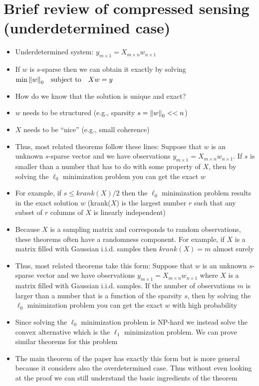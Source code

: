 \section{Brief review of compressed sensing (underdetermined case)}
\begin{itemize}
	\item Underdetermined system: $y_{m\times 1} = X_{m\times n}w_{n\times 1}$
	\item If $w$ is $s$-sparse then we can obtain it exactly by solving \\
	$ \min \norm{w}_0 \quad \text{subject to} \quad Xw = y $
	\item How do we know that the solution is unique and exact?
	\item $w$ needs to be structured (e.g., sparsity $s = \norm{w}_0 << n$)
	\item $X$ needs to be ``nice'' (e.g., small coherence)
	\item Thus, most related theorems follow these lines: Suppose that $w$ is an unknown $s$-sparse vector and we have observations $y_{m\times 1} = X_{m\times n}w_{n\times 1}$.
	If $s$ is smaller than a number that has to do with some property of $X$, then by solving the $\ell_0$ minimization problem you can get the exact $w$
	\item For example, if $s \leq krank(X)/2$ then the $\ell_0$ minimization problem results in the exact solution $w$ (krank($X$) is the largest number $r$ such that any subset of $r$ columns of $X$ is linearly independent)
	\item Because $X$ is a sampling matrix and corresponds to random observations, these theorems often have a randomness component. For example, if $X$ is a matrix filled with Gaussian i.i.d. samples then $krank(X) = m$ almost surely 	
	\item Thus, most related theorems take this form: Suppose that $w$ is an unknown $s$-sparse vector and we have observations $y_{m\times 1} = X_{m\times n}w_{n\times 1}$ where $X$ is a matrix filled with Gaussian i.i.d. samples. 
	If the number of observations $m$ is larger than a number that is a function of the sparsity $s$, then by solving the $\ell_0$ minimization problem you can get the exact $w$ with high probability
	\item Since solving the $\ell_0$ minimization problem is NP-hard we instead solve the convex alternative which is the $\ell_1$ minimization problem. We can prove similar theorems for this problem
	\item The main theorem of the paper has exactly this form but is more general because it considers also the overdetermined case. 
	Thus without even looking at the proof we can still understand the basic ingredients of the theorem	
\end{itemize} 

